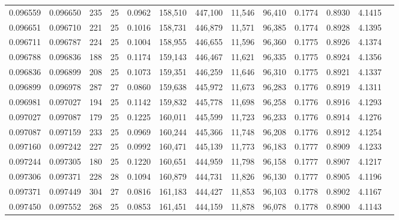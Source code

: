 \begin{tabular}{rrrrrrrrrrrrr}
0.096559 & 0.096650 & 235 &  25 &                                     0.0962 & 158,510 & 447,100 &  11,546 &  96,410 & 0.1774 & 0.8930 & 4.1415 \\
0.096651 & 0.096710 & 221 &  25 &                                     0.1016 & 158,731 & 446,879 &  11,571 &  96,385 & 0.1774 & 0.8928 & 4.1395 \\
0.096711 & 0.096787 & 224 &  25 &                                     0.1004 & 158,955 & 446,655 &  11,596 &  96,360 & 0.1775 & 0.8926 & 4.1374 \\
0.096788 & 0.096836 & 188 &  25 &                                     0.1174 & 159,143 & 446,467 &  11,621 &  96,335 & 0.1775 & 0.8924 & 4.1356 \\
0.096836 & 0.096899 & 208 &  25 &                                     0.1073 & 159,351 & 446,259 &  11,646 &  96,310 & 0.1775 & 0.8921 & 4.1337 \\
0.096899 & 0.096978 & 287 &  27 &                                     0.0860 & 159,638 & 445,972 &  11,673 &  96,283 & 0.1776 & 0.8919 & 4.1311 \\
0.096981 & 0.097027 & 194 &  25 &                                     0.1142 & 159,832 & 445,778 &  11,698 &  96,258 & 0.1776 & 0.8916 & 4.1293 \\
0.097027 & 0.097087 & 179 &  25 &                                     0.1225 & 160,011 & 445,599 &  11,723 &  96,233 & 0.1776 & 0.8914 & 4.1276 \\
0.097087 & 0.097159 & 233 &  25 &                                     0.0969 & 160,244 & 445,366 &  11,748 &  96,208 & 0.1776 & 0.8912 & 4.1254 \\
0.097160 & 0.097242 & 227 &  25 &                                     0.0992 & 160,471 & 445,139 &  11,773 &  96,183 & 0.1777 & 0.8909 & 4.1233 \\
0.097244 & 0.097305 & 180 &  25 &                                     0.1220 & 160,651 & 444,959 &  11,798 &  96,158 & 0.1777 & 0.8907 & 4.1217 \\
0.097306 & 0.097371 & 228 &  28 &                                     0.1094 & 160,879 & 444,731 &  11,826 &  96,130 & 0.1777 & 0.8905 & 4.1196 \\
0.097371 & 0.097449 & 304 &  27 &                                     0.0816 & 161,183 & 444,427 &  11,853 &  96,103 & 0.1778 & 0.8902 & 4.1167 \\
0.097450 & 0.097552 & 268 &  25 &                                     0.0853 & 161,451 & 444,159 &  11,878 &  96,078 & 0.1778 & 0.8900 & 4.1143 \\

\end{tabular}

